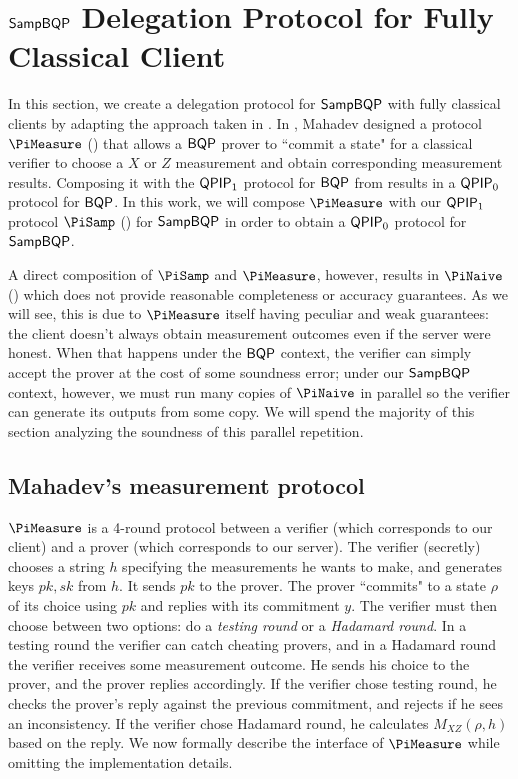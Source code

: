 \section{$\operatorname{\mathsf{SampBQP}}$ Delegation Protocol for Fully Classical Client}
\label{sec:qpip0_all}


In this section, we create a delegation protocol for $\operatorname{\mathsf{SampBQP}}$ with fully classical clients by adapting the approach taken in \cite{FOCS:Mahadev18a}. In \cite{FOCS:Mahadev18a}, 
Mahadev designed a protocol $\PiMeasure$ () that allows a $\operatorname{\mathsf{BQP}}$ prover to ``commit a state" for a classical verifier to choose a $X$ or $Z$ measurement and obtain corresponding measurement results.
Composing it with the $\operatorname{\mathsf{QPIP}}_1$ protocol for $\operatorname{\mathsf{BQP}}$ from \cite{mf16} results in a $\operatorname{\mathsf{QPIP}}_0$ protocol for $\operatorname{\mathsf{BQP}}$.
In this work, we will compose $\PiMeasure$ with our $\operatorname{\mathsf{QPIP}}_1$ protocol $\PiSamp$ () for $\operatorname{\mathsf{SampBQP}}$ in order to obtain a $\operatorname{\mathsf{QPIP}}_0$ protocol for $\operatorname{\mathsf{SampBQP}}$. 

A direct composition of $\PiSamp$ and $\PiMeasure$, however, results in $\PiNaive$ () which does not provide reasonable completeness or accuracy guarantees.
As we will see, this is due to $\PiMeasure$ itself having peculiar and weak guarantees:
the client doesn't always obtain measurement outcomes even if the server were honest.
When that happens under the $\operatorname{\mathsf{BQP}}$ context, the verifier can simply accept the prover at the cost of some soundness error;
under our $\operatorname{\mathsf{SampBQP}}$ context, however, we must run many copies of $\PiNaive$ in parallel so the verifier can generate its outputs from some copy.
We will spend the majority of this section analyzing the soundness of this parallel repetition.

\subsection{Mahadev's measurement protocol}\label{sec:urmila4}

$\PiMeasure$ is a 4-round protocol between a verifier (which corresponds to our client) and a prover (which corresponds to our server).
The verifier (secretly) chooses a string $h$ specifying the measurements he wants to make, and generates keys $pk, sk$ from $h$. It sends $pk$ to the prover. The prover ``commits" to a state $\rho$ of its choice using $pk$ and replies with its commitment $y$.
The verifier must then choose between two options: do a \emph{testing round} or a \emph{Hadamard round}.
In a testing round the verifier can catch cheating provers,
and in a Hadamard round the verifier receives some measurement outcome.
He sends his choice to the prover, and the prover replies accordingly. If the verifier chose testing round, he checks the prover's reply against the previous commitment, and rejects if he sees an inconsistency. If the verifier chose Hadamard round, he calculates $M_{XZ}(\rho, h)$ based on the reply.
We now formally describe the interface of $\PiMeasure$ while omitting the implementation details.

